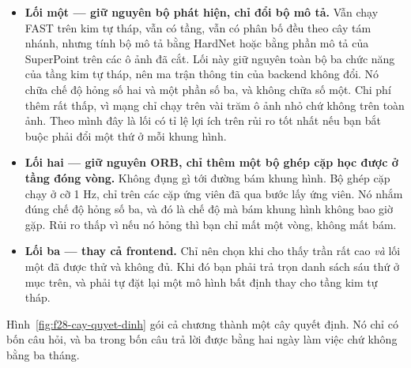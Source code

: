 \documentclass[../../deep_learning.tex]{subfiles}
\begin{document}
\begin{itemize}
\item \textbf{Lối một --- giữ nguyên bộ phát hiện, chỉ đổi bộ mô tả.} Vẫn chạy FAST trên kim tự tháp, vẫn có tầng, vẫn có phân bố đều theo cây tám nhánh, nhưng tính bộ mô tả bằng HardNet hoặc bằng phần mô tả của SuperPoint trên các ô ảnh đã cắt. Lối này giữ nguyên toàn bộ ba chức năng của tầng kim tự tháp, nên ma trận thông tin của backend không đổi. Nó chữa chế độ hỏng số hai và một phần số ba, và không chữa số một. Chi phí thêm rất thấp, vì mạng chỉ chạy trên vài trăm ô ảnh nhỏ chứ không trên toàn ảnh. Theo mình đây là lối có tỉ lệ lợi ích trên rủi ro tốt nhất nếu bạn bắt buộc phải đổi một thứ ở mỗi khung hình.
\item \textbf{Lối hai --- giữ nguyên ORB, chỉ thêm một bộ ghép cặp học được ở tầng đóng vòng.} Không đụng gì tới đường bám khung hình. Bộ ghép cặp chạy ở cỡ 1 Hz, chỉ trên các cặp ứng viên đã qua bước lấy ứng viên. Nó nhắm đúng chế độ hỏng số ba, và đó là chế độ mà bám khung hình không bao giờ gặp. Rủi ro thấp vì nếu nó hỏng thì bạn chỉ mất một vòng, không mất bám.
\item \textbf{Lối ba --- thay cả frontend.} Chỉ nên chọn khi  cho thấy trần rất cao \emph{và} lối một đã được thử và không đủ. Khi đó bạn phải trả trọn danh sách sáu thứ ở mục trên, và phải tự đặt lại một mô hình bất định thay cho tầng kim tự tháp.
\end{itemize}

Hình~\ref{fig:f28-cay-quyet-dinh} gói cả chương thành một cây quyết định. Nó chỉ có bốn câu hỏi, và ba trong bốn câu trả lời được bằng hai ngày làm việc chứ không bằng ba tháng.
\end{document}
